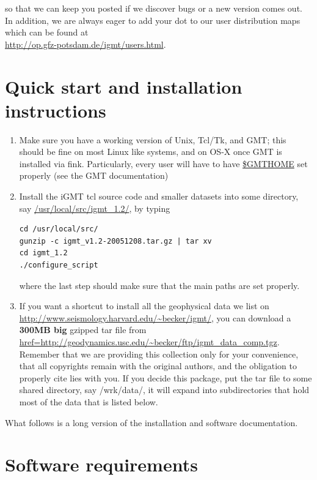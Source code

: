 \documentclass[11pt]{article}
\begin{document}
so that we can keep you posted if we discover bugs or a new version
comes out. In addition, we are always eager to add your dot to our
user distribution maps which can be found at\\

\url{http://op.gfz-potsdam.de/igmt/users.html}.


\clearpage


\section{Quick start and installation instructions}

\begin{enumerate}

\item Make sure you have a working version of Unix, Tcl/Tk, and GMT; this
should be fine on most Linux like systems, and on OS-X once GMT is
installed via fink. Particularly, every user will have to have
\url{$GMTHOME} set properly (see the GMT documentation)

\item Install the iGMT tcl source code and smaller datasets into some
  directory, say \url{/usr/local/src/igmt_1.2/}, by typing
\begin{verbatim}
cd /usr/local/src/
gunzip -c igmt_v1.2-20051208.tar.gz | tar xv 
cd igmt_1.2
./configure_script
\end{verbatim}
where the last step should make sure that the main paths are set
properly.  


\item If you want a shortcut to install all the geophysical data we
  list on \url{http://www.seismology.harvard.edu/~becker/igmt/}, you
  can download a {\bf 300MB big} gzipped tar file from
  \url{href=http://geodynamics.usc.edu/~becker/ftp/igmt_data_comp.tgz}.
  Remember that we are providing this collection only for your
  convenience, that all copyrights remain with the original
  authors, and the obligation to properly cite lies with you.  If you
  decide this package, put the tar file to some shared directory, say
  /wrk/data/, it will expand into subdirectories that hold most of the
  data that is listed below.
\end{enumerate}


What follows is a long version of the installation and software
documentation. 




\section{Software requirements\label{req}}
\end{document}
